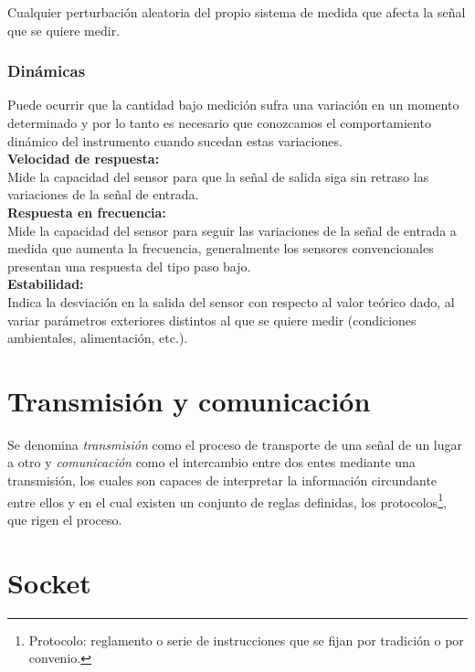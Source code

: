 Cualquier perturbación aleatoria del propio sistema de medida que afecta la señal 
que se quiere medir. \\

\subsubsection{Dinámicas}

Puede ocurrir que la cantidad bajo medición sufra una variación en un momento determinado y por lo tanto es necesario que conozcamos el comportamiento dinámico del instrumento 
cuando sucedan estas variaciones.\\

\textbf{Velocidad de respuesta:}\\

Mide la capacidad del sensor para que la señal de salida siga sin retraso las variaciones de la señal de entrada. \\

\textbf{Respuesta en frecuencia:}\\

Mide la capacidad del sensor para seguir las variaciones de la 
señal  de  entrada  a  medida  que  aumenta  la  frecuencia,  generalmente  los  sensores 
convencionales presentan una respuesta del tipo paso bajo.\\

\textbf{Estabilidad:}\\

Indica  la  desviación  en  la  salida  del  sensor  con  respecto  al  valor  teórico 
dado,  al  variar  parámetros  exteriores  distintos  al  que  se  quiere  medir  (condiciones 
ambientales, alimentación, etc.). \\


\section{Transmisión y comunicación}
\label{sec:transmisión}

Se denomina \emph{transmisión} como el proceso de transporte de una señal de un lugar a otro y \emph{comunicación} como el intercambio entre dos entes mediante una transmisión, los cuales son capaces de
interpretar la información circundante entre ellos y en el cual existen un conjunto de reglas definidas, los protocolos\footnote{Protocolo: reglamento o serie de instrucciones que se fijan por tradición o por convenio. },
que rigen el proceso.

\section{Socket}
\label{sec:def-socket}

